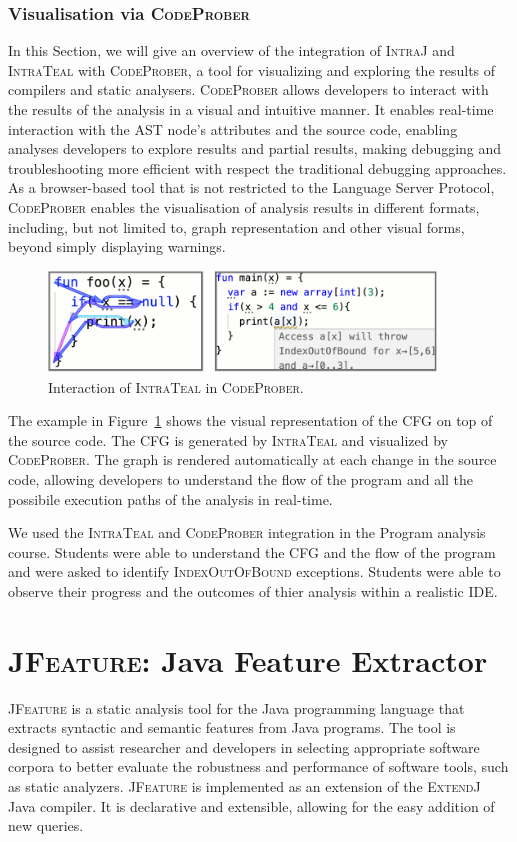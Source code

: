 \subsubsection{Visualisation via \textsc{CodeProber}}
In this Section, we will give an overview of the integration of \textsc{IntraJ} and \textsc{IntraTeal}
with \textsc{CodeProber}, a tool for visualizing and 
exploring the results of compilers and static analysers. \textsc{CodeProber} 
allows developers to interact with the results of the analysis in a visual and intuitive 
manner. It enables real-time interaction with the AST node's attributes and the source code, 
enabling analyses developers to explore results and partial results, making 
debugging and troubleshooting more efficient with respect the traditional debugging
approaches. As a browser-based tool that is not restricted to the Language Server Protocol, 
\textsc{CodeProber} enables the visualisation of analysis results in different 
formats, including, but not limited to, graph representation and other visual forms, beyond
simply displaying warnings.
\begin{figure}[H]
  \centering
  \includegraphics[width=0.92\textwidth]{kappa/img/CP.pdf}
  \caption{\label{fig:CodeProber} Interaction of \textsc{IntraTeal} in \textsc{CodeProber}.}
\end{figure}
The example in Figure~\ref{fig:CodeProber} shows the visual representation of the CFG on
top of the source code. The CFG is generated by \textsc{IntraTeal} and visualized by
\textsc{CodeProber}. The graph is rendered automatically at each change in the source code,
allowing developers to understand the flow of the program and all the possibile execution paths of the
analysis in real-time. 

We used the \textsc{IntraTeal} and \textsc{CodeProber} integration in the Program analysis
course. Students were able to understand the CFG and the flow of the program and 
were asked to identify \textsc{IndexOutOfBound} exceptions. Students were able to
observe their progress and the outcomes of thier analysis within a realistic IDE.



\section{\textsc{JFeature}: Java Feature Extractor}
\label{sec:JFeature}
\textsc{JFeature} is a static analysis tool for the Java programming language that extracts
syntactic and semantic features from Java programs. The tool is designed to assist
researcher and developers in selecting appropriate software corpora to better evaluate the robustness
and performance of software tools, such as static analyzers.
\textsc{JFeature} is implemented as an extension of the \textsc{ExtendJ} Java compiler. It is declarative
and extensible, allowing for the easy addition of new queries.

